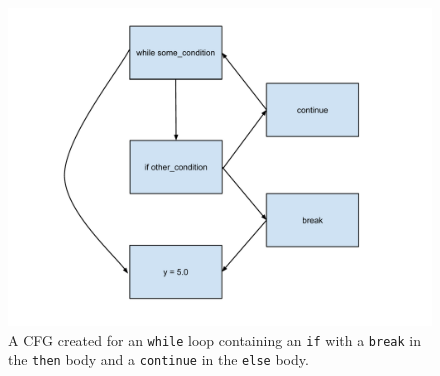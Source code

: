 \documentclass[12pt, titlepage]{article}
\begin{document}
\begin{figure}
    \centering
    \includegraphics[scale=0.6]{images/whileCFG.pdf}
    \caption{A CFG created for an \texttt{while} loop containing an \texttt{if} with a \texttt{break} in the \texttt{then} body and a \texttt{continue} in the \texttt{else} body.}
    \label{fig:whileCFG}
\end{figure}
\end{document}
